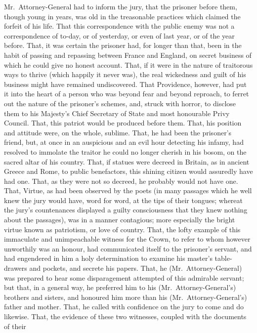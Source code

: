 Mr.\ Attorney-General had to inform the jury, that the prisoner before
them, though young in years, was old in the treasonable practices
which claimed the forfeit of his life.  That this correspondence with
the public enemy was not a correspondence of to-day, or of yesterday,
or even of last year, or of the year before.  That, it was certain
the prisoner had, for longer than that, been in the habit of passing
and repassing between France and England, on secret business of which
he could give no honest account.  That, if it were in the nature of
traitorous ways to thrive (which happily it never was), the real
wickedness and guilt of his business might have remained undiscovered.
That Providence, however, had put it into the heart of a person who
was beyond fear and beyond reproach, to ferret out the nature of the
prisoner's schemes, and, struck with horror, to disclose them to his
Majesty's Chief Secretary of State and most honourable Privy Council.
That, this patriot would be produced before them.  That, his position
and attitude were, on the whole, sublime.  That, he had been the
prisoner's friend, but, at once in an auspicious and an evil hour
detecting his infamy, had resolved to immolate the traitor he could
no longer cherish in his bosom, on the sacred altar of his country.
That, if statues were decreed in Britain, as in ancient Greece and
Rome, to public benefactors, this shining citizen would assuredly
have had one.  That, as they were not so decreed, he probably would
not have one.  That, Virtue, as had been observed by the poets (in
many passages which he well knew the jury would have, word for word,
at the tips of their tongues; whereat the jury's countenances
displayed a guilty consciousness that they knew nothing about the
passages), was in a manner contagious; more especially the bright
virtue known as patriotism, or love of country.  That, the lofty
example of this immaculate and unimpeachable witness for the Crown,
to refer to whom however unworthily was an honour, had communicated
itself to the prisoner's servant, and had engendered in him a holy
determination to examine his master's table-drawers and pockets, and
secrete his papers.  That, he (Mr.\ Attorney-General) was prepared to
hear some disparagement attempted of this admirable servant; but that,
in a general way, he preferred him to his (Mr.\ Attorney-General's)
brothers and sisters, and honoured him more than his
(Mr.\ Attorney-General's) father and mother.  That, he called with
confidence on the jury to come and do likewise.  That, the evidence
of these two witnesses, coupled with the documents of their
